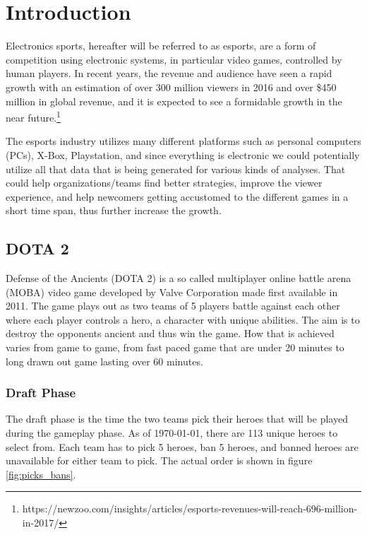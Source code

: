 \documentclass[report.tex]{subfiles}
\begin{document}
\section*{\centering Introduction}

Electronics sports, hereafter will be referred to as esports, are a form of competition using electronic systems, in particular video games, controlled by human players. In recent years, the revenue and audience have seen a rapid growth with an estimation of over 300 million viewers in 2016 and over \$450 million in global revenue, and it is expected to see a formidable growth in the near future.\footnote{https://newzoo.com/insights/articles/esports-revenues-will-reach-696-million-in-2017/}

The esports industry utilizes many different platforms such as personal computers (PCs), X-Box, Playstation, and since everything is electronic we could potentially utilize all that data that is being generated for various kinds of analyses. That could help organizations/teams find better strategies, improve the viewer experience, and help newcomers getting accustomed to the different games in a short time span, thus further increase the growth.

\subsection*{DOTA 2}

Defense of the Ancients (DOTA 2) is a so called multiplayer online battle arena (MOBA) video game developed by Valve Corporation made first available in 2011. The game plays out as two teams of 5 players battle against each other where each player controls a hero, a character with unique abilities. The aim is to destroy the opponents ancient and thus win the game. How that is achieved varies from game to game, from fast paced game that are under 20 minutes to long drawn out game lasting over 60 minutes.

\subsubsection*{Draft Phase}

The draft phase is the time the two teams pick their heroes that will be played during the gameplay phase. As of \today, there are 113 unique heroes to select from. Each team has to pick 5 heroes, ban 5 heroes, and banned heroes are unavailable for either team to pick. The actual order is shown in figure \ref{fig:picks_bans}.
\end{document}
